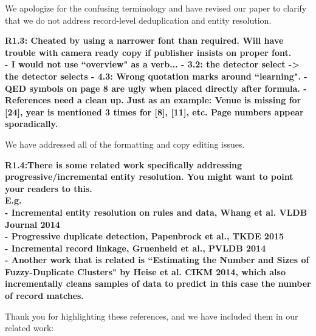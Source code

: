 We apologize for the confusing terminology and have revised our paper to clarify that we do not address record-level deduplication and entity resolution.

\vspace{0.5em}

\noindent\textbf{R1.3: Cheated by using a narrower font than required. Will have trouble with camera ready copy if publisher insists on proper font.\\
- I would not use ``overview" as a verb...
- 3.2: the detector select -> the detector selects
- 4.3: Wrong quotation marks around ``learning".
- QED symbols on page 8 are ugly when placed directly after formula. 
- References need a clean up. Just as an example: Venue is missing for [24], year is mentioned 3 times for [8], [11], etc. Page numbers appear sporadically.}

\noindent We have addressed all of the formatting and copy editing issues.

\vspace{0.5em}

\noindent\textbf{R1.4:There is some related work specifically addressing progressive/incremental entity resolution. You might want to point your readers to this.
\\E.g.
\\- Incremental entity resolution on rules and data, Whang et al. VLDB Journal 2014
\\- Progressive duplicate detection, Papenbrock et al., TKDE 2015
\\- Incremental record linkage, Gruenheid et al., PVLDB 2014
\\- Another work that is related is ``Estimating the Number and Sizes of Fuzzy-Duplicate Clusters" by Heise et al. CIKM 2014, which also incrementally cleans samples of data to predict in this case the number of record matches.}

Thank you for highlighting these references, and we have included them in our related work:

